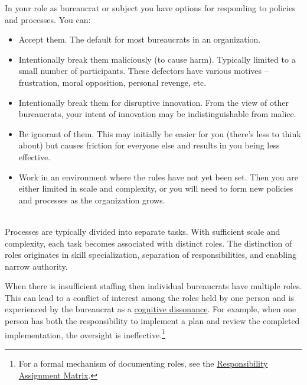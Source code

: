 In your role as bureaucrat or subject you have options for responding to policies and processes. You can:
\begin{itemize}
    \item Accept them. The default for most bureaucrats in an  organization.
    \item Intentionally break them maliciously (to cause harm). Typically limited to a small number of participants. These defectors have various motives -- frustration, moral opposition, personal revenge, etc.
    \item Intentionally break them for disruptive innovation. 
    From the view of other bureaucrats, your intent of innovation may be indistinguishable from malice. 
    \item Be ignorant of them. This may initially be easier for you (there's less to think about) but causes friction for everyone else and results in you being less effective. 
    \item Work in an environment where the rules have not yet been set. Then you are either limited in scale and complexity, or you will need to form new policies and processes as the organization grows.
\end{itemize}

\ \\

Processes are typically divided into separate tasks. With sufficient scale and complexity, each task becomes associated with distinct roles. The distinction of roles originates in skill specialization, separation of responsibilities, and enabling narrow authority. 

When there is insufficient staffing then individual bureaucrats have multiple roles. This can lead to a conflict of interest among the roles held by one person and is experienced by the bureaucrat as a \href{https://en.wikipedia.org/wiki/Cognitive_dissonance}{cognitive dissonance}. 
For example, when one person has both the responsibility to implement a plan and review the completed implementation, the oversight is ineffective.\footnote{For a formal mechanism of documenting roles, see the 
\href{https://en.wikipedia.org/wiki/Responsibility_assignment_matrix}{Responsibility Assignment Matrix}.
}

